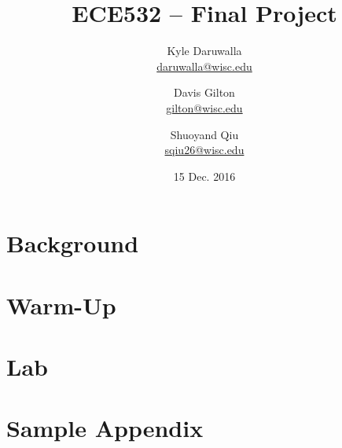 \documentclass{report}
\title{ECE532 -- Final Project}
\author{Kyle Daruwalla \\ \href{mailto:daruwalla@wisc.edu}{daruwalla@wisc.edu}
    \and Davis Gilton \\ \href{mailto:gilton@wisc.edu}{gilton@wisc.edu}
    \and Shuoyand Qiu \\ \href{mailto:sqiu26@wisc.edu}{sqiu26@wisc.edu}
}
\date{15 Dec. 2016}
\renewcommand\appendix{\par
  \setcounter{section}{0}
  \setcounter{subsection}{0}
  \setcounter{figure}{0}
  \setcounter{table}{0}
  \renewcommand\thesection{Appendix \Alph{section}}
  \renewcommand\thefigure{\Alph{section}\arabic{figure}}
  \renewcommand\thetable{\Alph{section}\arabic{table}}
}
\begin{document}
\maketitle

\begin{abstract}
    
\end{abstract}

\section{Background}
\label{sec:background}


\section{Warm-Up}
\label{sec:warm-up}


\section{Lab}
\label{sec:lab}


\newpage
\nocite{*}


\newpage
\appendix
\section{Sample Appendix}
\label{app:sample-appendix}

\end{document}

